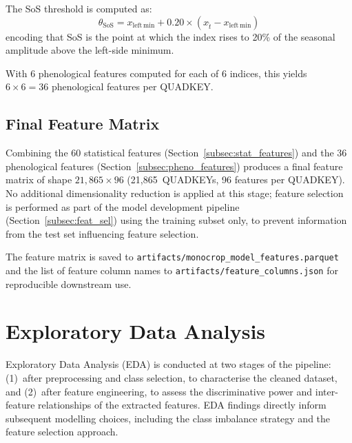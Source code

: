 The SoS threshold is computed as:
\begin{equation}
\label{eq:sos_threshold}
\theta_{\mathrm{SoS}} = x_{\mathrm{left\,min}} + 0.20 \times (x_{\hat{t}} - x_{\mathrm{left\,min}})
\end{equation}
encoding that SoS is the point at which the index rises to 20\% of the
seasonal amplitude above the left-side minimum.

With 6 phenological features computed for each of 6 indices, this yields
$6 \times 6 = 36$ phenological features per QUADKEY.


\subsection{Final Feature Matrix}
\label{subsec:feature_matrix}

Combining the 60 statistical features (Section~\ref{subsec:stat_features})
and the 36 phenological features (Section~\ref{subsec:pheno_features})
produces a final feature matrix of shape $21{,}865 \times 96$
(21,865~QUADKEYs, 96 features per QUADKEY). No additional dimensionality
reduction is applied at this stage; feature selection is performed as part
of the model development pipeline (Section~\ref{subsec:feat_sel}) using
the training subset only, to prevent information from the test set
influencing feature selection.

The feature matrix is saved to
\texttt{artifacts/monocrop\_model\_features.parquet} and the list of
feature column names to \texttt{artifacts/feature\_columns.json} for
reproducible downstream use.


\section{Exploratory Data Analysis}
\label{sec:eda}

Exploratory Data Analysis (EDA) is conducted at two stages of the
pipeline: (1)~after preprocessing and class selection, to characterise
the cleaned dataset, and (2)~after feature engineering, to assess the
discriminative power and inter-feature relationships of the extracted
features. EDA findings directly inform subsequent modelling choices,
including the class imbalance strategy and the feature selection approach.


